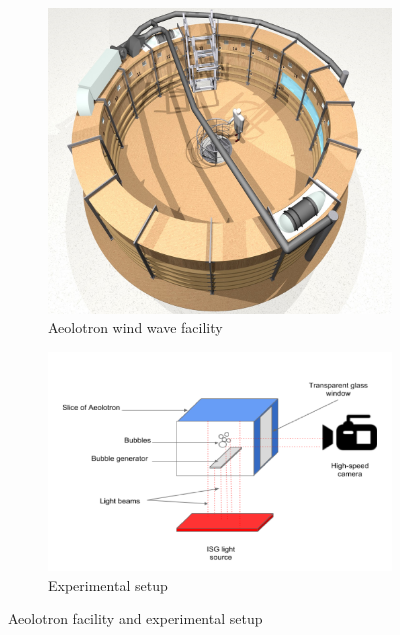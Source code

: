 		\begin{figure}
			\centering
			\begin{subfigure}[b]{.55\textwidth}
				\centering
				\includegraphics[scale=0.1]{images/aeolotron-gesamt.jpg}
				\caption{Aeolotron wind wave facility}
			\end{subfigure}

			\begin{subfigure}[b]{.55\textwidth}		
				\centering
				\includegraphics[scale=.8]{images/aeolotron_setup.png}
				\caption{Experimental setup}
			\end{subfigure}
			
			\caption{Aeolotron facility and experimental setup}
			\label{fig:aeolotron_setup}
		\end{figure}
	
